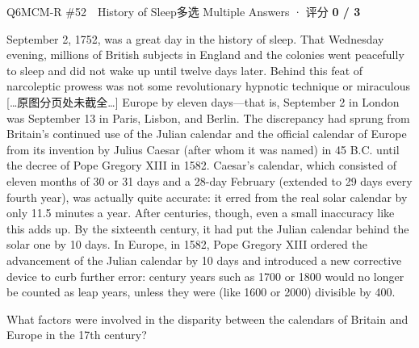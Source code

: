 \begin{qblock}{Q6\quad MCM-R \#52\ \ History of Sleep}{多选 Multiple Answers · 评分 \textcolor{cAccent}{\bfseries 0 / 3}}
\begin{promptbox}
September 2, 1752, was a great day in the history of sleep. That Wednesday evening, millions of British subjects in England and the colonies went peacefully to sleep and did not wake up until twelve days later. Behind this feat of narcoleptic prowess was not some revolutionary hypnotic technique or miraculous {\footnotesize\color{cWrong}[…原图分页处未截全…]} Europe by eleven days---that is, September 2 in London was September 13 in Paris, Lisbon, and Berlin. The discrepancy had sprung from Britain's continued use of the Julian calendar and the official calendar of Europe from its invention by Julius Caesar (after whom it was named) in 45 B.C. until the decree of Pope Gregory XIII in 1582. Caesar's calendar, which consisted of eleven months of 30 or 31 days and a 28-day February (extended to 29 days every fourth year), was actually quite accurate: it erred from the real solar calendar by only 11.5 minutes a year. After centuries, though, even a small inaccuracy like this adds up. By the sixteenth century, it had put the Julian calendar behind the solar one by 10 days. In Europe, in 1582, Pope Gregory XIII ordered the advancement of the Julian calendar by 10 days and introduced a new corrective device to curb further error: century years such as 1700 or 1800 would no longer be counted as leap years, unless they were (like 1600 or 2000) divisible by 400.
\end{promptbox}
\begin{notebox}\small What factors were involved in the disparity between the calendars of Britain and Europe in the 17th century?\end{notebox}

\end{qblock}
